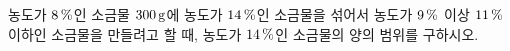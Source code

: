 농도가 $8\mkern3mu \%$인 소금물 $300\mkern3mu \mathrm{g}$에 농도가 $14\mkern3mu \%$인 소금물을 섞어서 농도가 $9\mkern3mu \%$ 이상 $11\mkern3mu \%$ 이하인 소금물을 만들려고 할 때, 농도가 $14\mkern3mu \%$인 소금물의 양의 범위를 구하시오.
